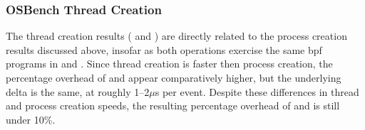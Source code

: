 
\subsubsection{OSBench Thread Creation}

The thread creation results ( and ) are directly related to the
process creation results discussed above, insofar as both operations exercise the same
\gls{bpf} programs in \bpfbox{} and \bpfcontain{}. Since thread creation is faster then
process creation, the percentage overhead of \bpfbox{} and \bpfcontain{} appear
comparatively higher, but the underlying delta is the same, at roughly 1--2$\mu$s per
event. Despite these differences in thread and process creation speeds, the resulting
percentage overhead of \bpfbox{} and \bpfcontain{} is still under 10\%.

